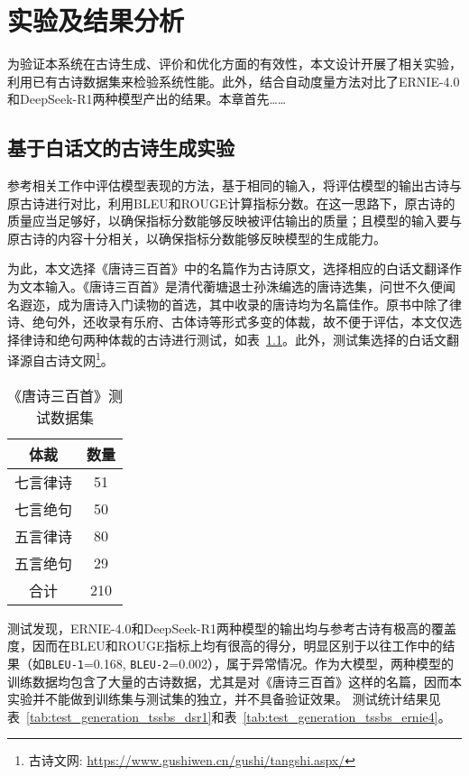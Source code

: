 
\chapter{实验及结果分析}

为验证本系统在古诗生成、评价和优化方面的有效性，本文设计开展了相关实验，利用已有古诗数据集来检验系统性能。此外，结合自动度量方法对比了ERNIE-4.0和DeepSeek-R1两种模型产出的结果。本章首先……

\section{基于白话文的古诗生成实验}

参考相关工作中评估模型表现的方法，基于相同的输入，将评估模型的输出古诗与原古诗进行对比，利用BLEU和ROUGE计算指标分数。在这一思路下，原古诗的质量应当足够好，以确保指标分数能够反映被评估输出的质量；且模型的输入要与原古诗的内容十分相关，以确保指标分数能够反映模型的生成能力。

为此，本文选择《唐诗三百首》中的名篇作为古诗原文，选择相应的白话文翻译作为文本输入。《唐诗三百首》是清代蘅塘退士孙洙编选的唐诗选集，问世不久便闻名遐迩，成为唐诗入门读物的首选，其中收录的唐诗均为名篇佳作。原书中除了律诗、绝句外，还收录有乐府、古体诗等形式多变的体裁，故不便于评估，本文仅选择律诗和绝句两种体裁的古诗进行测试，如表~\ref{tab:test_generation_data}。此外，测试集选择的白话文翻译源自古诗文网\footnote{古诗文网: \url{https://www.gushiwen.cn/gushi/tangshi.aspx/}}。


\begin{table}[ht]
    \centering
    \caption{《唐诗三百首》测试数据集}
    \label{tab:test_generation_data}
    \begin{tabular}{|c|c|}
      \hline
      \bf{体裁}& \bf{数量} \\
      \hline
      七言律诗& 51\\
      \hline
      七言绝句& 50\\
      \hline
      五言律诗& 80\\
      \hline
      五言绝句& 29\\
      \hline
      合计& 210\\
      \hline
    \end{tabular}
  \end{table}

测试发现，ERNIE-4.0和DeepSeek-R1两种模型的输出均与参考古诗有极高的覆盖度，因而在BLEU和ROUGE指标上均有很高的得分，明显区别于以往工作中的结果（如\verb|BLEU-1|=0.168, \verb|BLEU-2|=0.002\cite{chenPolishingModelMachineGenerated2024}），属于异常情况。作为大模型，两种模型的训练数据均包含了大量的古诗数据，尤其是对《唐诗三百首》这样的名篇，因而本实验并不能做到训练集与测试集的独立，并不具备验证效果。
测试统计结果见表~\ref{tab:test_generation_tssbs_dsr1}和表~\ref{tab:test_generation_tssbs_ernie4}。


